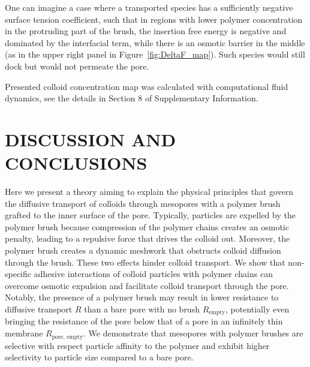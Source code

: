\documentclass[12pt, a4paper]{article}
\newcommand\todo[1]{\textcolor{red}{#1}}
\begin{document}
One can imagine a case where a transported species has a sufficiently negative surface tension coefficient, such that in regions with lower polymer concentration in the protruding part of the brush, the insertion free energy is negative and dominated by the interfacial term, while there is an osmotic barrier in the middle (as in the upper right panel in Figure~\ref{fig:DeltaF_map}).
Such species would still dock but would not permeate the pore.



Presented colloid concentration map was calculated with computational fluid dynamics, see the details in Section 8 of Supplementary Information.
\section{DISCUSSION AND CONCLUSIONS}
Here we present a theory aiming to explain the physical principles that govern the diffusive transport of colloids through mesopores with a polymer brush grafted to the inner surface of the pore.
Typically, particles are expelled by the polymer brush because compression of the polymer chains creates an osmotic penalty, leading to a repulsive force that drives the colloid out.
Moreover, the polymer brush creates a dynamic meshwork that obstructs colloid diffusion through the brush.
These two effects hinder colloid transport.
We show that non-specific adhesive interactions of colloid particles with polymer chains can overcome osmotic expulsion and facilitate colloid transport through the pore.
Notably, the presence of a polymer brush may result in lower resistance to diffusive transport $R$ than a bare pore with no brush $R_{\text{empty}}$, potentially even bringing the resistance of the pore below that of a pore in an infinitely thin membrane $R_{\text{pore, empty}}$.
We demonstrate that mesopores with polymer brushes are selective with respect particle affinity to the polymer and exhibit higher selectivity to particle size compared to a bare pore.
\end{document}
